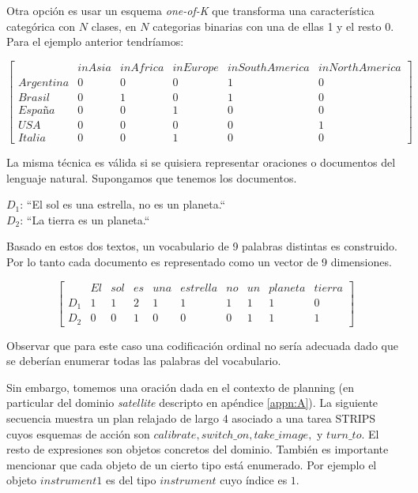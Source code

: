 Otra opción es usar un esquema \emph{one-of-K} que
transforma una característica categórica con $N$ clases, en $N$ categorias
binarias con una de ellas 1 y el resto 0. Para el ejemplo anterior tendríamos:

\begin{equation*}
\begin{bmatrix}
    & inAsia & inAfrica & inEurope & inSouthAmerica & inNorthAmerica \\
    Argentina & 0 & 0 & 0 & 1 & 0 \\
    Brasil & 0 & 1 & 0 & 1 & 0 \\
    España & 0 & 0 & 1 & 0 & 0 \\
    USA & 0 & 0 & 0 & 0 & 1 \\
    Italia & 0 & 0 & 1 & 0 & 0
\end{bmatrix}
\end{equation*}

La misma técnica es válida si se quisiera representar oraciones o documentos del
lenguaje natural. Supongamos que tenemos los documentos.

\begin{center}
    $D_1$: ``El sol es una estrella, no es un planeta.`` \\
    $D_2$: ``La tierra es un planeta.``    
\end{center}

Basado en  estos dos textos, un vocabulario de 9 palabras distintas es
construido. Por lo tanto cada documento es representado como un vector de 9
dimensiones.

\begin{equation*}
    \begin{bmatrix}
        & El & sol & es & una & estrella & no & un & planeta & tierra \\
        D_1 & 1 & 1 & 2 & 1 & 1 & 1 & 1 & 1 & 0  \\
        D_2 & 0 & 0 & 1 & 0 & 0 & 0 & 1 & 1 & 1 
    \end{bmatrix}
\end{equation*}

Observar que para este caso una codificación ordinal no sería adecuada dado que
se deberían enumerar todas las palabras del vocabulario.

Sin embargo, tomemos una oración dada en el contexto de planning (en particular
del dominio \emph{satellite} descripto en apéndice \ref{appn:A}). La siguiente secuencia
muestra un plan relajado de largo 4 asociado a una tarea STRIPS cuyos esquemas
de acción son $calibrate, switch\_on, take\_image,$ y $turn\_to$. El resto de
expresiones son objetos concretos del dominio. También es importante mencionar
que cada objeto de un cierto tipo está enumerado. Por ejemplo el objeto
$instrument1$ es del tipo $instrument$ cuyo índice es $1$. 

